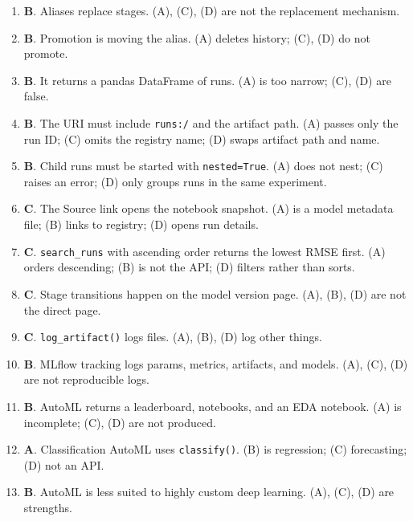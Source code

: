\documentclass[11pt]{article}
\begin{document}
\begin{enumerate}[leftmargin=*, label=\textbf{Q\arabic*.}]
		\item \textbf{B}. Aliases replace stages. (A), (C), (D) are not the replacement mechanism.
		
		\item \textbf{B}. Promotion is moving the alias. (A) deletes history; (C), (D) do not promote.
		
		\item \textbf{B}. It returns a pandas DataFrame of runs. (A) is too narrow; (C), (D) are false.
		
		\item \textbf{B}. The URI must include \texttt{runs:/} and the artifact path. (A) passes only the run ID; (C) omits the registry name; (D) swaps artifact path and name.
		
		\item \textbf{B}. Child runs must be started with \texttt{nested=True}. (A) does not nest; (C) raises an error; (D) only groups runs in the same experiment.
		
		\item \textbf{C}. The Source link opens the notebook snapshot. (A) is a model metadata file; (B) links to registry; (D) opens run details.
		
		\item \textbf{C}. \texttt{search\_runs} with ascending order returns the lowest RMSE first. (A) orders descending; (B) is not the API; (D) filters rather than sorts.
		
		\item \textbf{C}. Stage transitions happen on the model version page. (A), (B), (D) are not the direct page.
		
		\item \textbf{C}. \texttt{log\_artifact()} logs files. (A), (B), (D) log other things.
		
		\item \textbf{B}. MLflow tracking logs params, metrics, artifacts, and models. (A), (C), (D) are not reproducible logs.
		
		\item \textbf{B}. AutoML returns a leaderboard, notebooks, and an EDA notebook. (A) is incomplete; (C), (D) are not produced.
		
		\item \textbf{A}. Classification AutoML uses \texttt{classify()}. (B) is regression; (C) forecasting; (D) not an API.
		
		\item \textbf{B}. AutoML is less suited to highly custom deep learning. (A), (C), (D) are strengths.
		

\end{enumerate}
\end{document}
